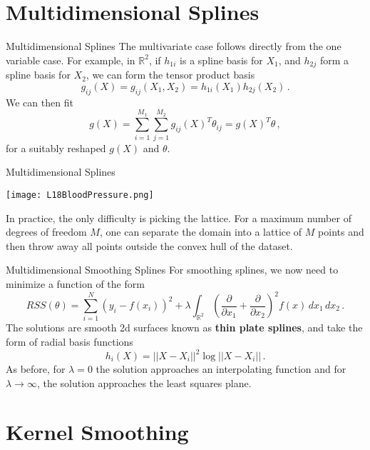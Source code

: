 \documentclass[10pt, table, dvipsnames,xcdraw,handout]{beamer}
\begin{document}
\section{Multidimensional Splines}

\begin{frame}[fragile]{Multidimensional Splines}
The multivariate case follows directly from the one variable case. \pause For example, in $\mathbb{R}^2$, if $h_{1i}$ is a spline basis for $X_1$, and $h_{2j}$ form a spline basis for $X_2$, we can form the tensor product basis
$$
g_{ij}(X)  = g_{ij}(X_1,X_2) = h_{1i}(X_1)h_{2j}(X_2)\,.
$$\pause
We can then fit 
$$
g(X) = \sum_{i=1}^{M_1}\sum_{j=1}^{M_2} g_{ij}(X)^T\theta_{ij} = g(X)^T\theta\,,
$$
for a suitably reshaped $g(X)$ and $\theta$.
\end{frame}


\begin{frame}[fragile]{Multidimensional Splines}
  \begin{minipage}[t][0.5\textheight][t]{\textwidth}
	\centering \texttt{[image: L18BloodPressure.png]} 
  \end{minipage}
  \vfill
\begin{minipage}[t][0.5\textheight][t]{\textwidth}
In practice, the only difficulty is picking the lattice. For a maximum number of degrees of freedom $M$, one can separate the domain into a lattice of $M$ points and then throw away all points outside the convex hull of the dataset. 
\end{minipage}
\end{frame}



\begin{frame}[fragile]{Multidimensional Smoothing Splines}
For smoothing splines, we now need to minimize a function of the form
$$
RSS(\theta) = \sum_{i=1}^N(y_i - f(x_i))^2 + \lambda\int_{\mathbb{R}^2} \left( \frac{\partial}{\partial x_1} + \frac{\partial}{\partial x_2}\right)^2 f(x)\,dx_1\,dx_2\,.
$$\pause 
The solutions are smooth 2d surfaces known as \textbf{thin plate splines}, and take the form of radial basis functions
$$
h_i(X) = ||X-X_i||^2\log||X - X_i||\,.
$$
As before, for $\lambda = 0$ the solution approaches an interpolating function and for $\lambda\to \infty$, the solution approaches the least squares plane. 
\end{frame}




\section{Kernel Smoothing}
\end{document}
